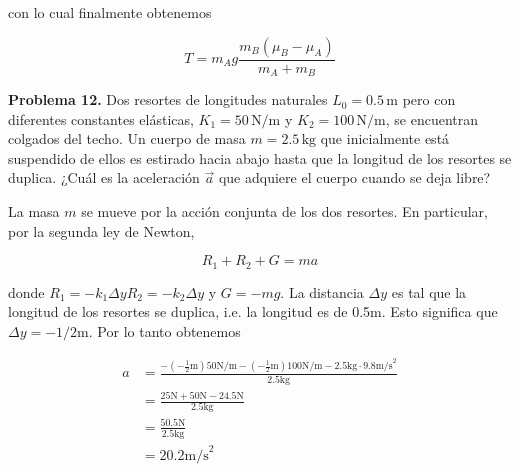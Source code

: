 \documentclass[12pt]{article}
\theoremstyle{definition}
\begin{document}
con lo cual finalmente obtenemos 

\begin{equation*}
    T = m_A g \frac{m_B(\mu_B - \mu_A)}{m_A + m_B}
\end{equation*}

\pagebreak

\begin{shaded}
\textbf{Problema 12.}  
Dos resortes de longitudes naturales $L_0 = 0.5 \, \text{m}$ pero con diferentes constantes 
elásticas, $K_1 = 50 \, \text{N/m}$ y $K_2 = 100 \, \text{N/m}$, se encuentran colgados del 
techo. Un cuerpo de masa $m = 2.5 \, \text{kg}$ que inicialmente está suspendido de ellos es 
estirado hacia abajo hasta que la longitud de los resortes se duplica. ¿Cuál es la aceleración 
$\vec{a}$ que adquiere el cuerpo cuando se deja libre? \\[1em]

\begin{center}
\end{center}
\end{shaded}

La masa $m$ se mueve por la acción conjunta de los dos resortes. En particular,
por la segunda ley de Newton, 

\begin{equation*}
    R_1 + R_2 + G = ma
\end{equation*}

donde $R_1 = -k_1 \Delta y R_2 = -k_2 \Delta y$ y $G = -mg$. La distancia
$\Delta y$ es tal que la longitud de los resortes se duplica, i.e. la longitud
es de 0.5m. Esto significa que $\Delta y = -1 / 2 \text{m}$. Por lo tanto obtenemos 


\begin{align*}
    a 
    &= \frac{ -\left(-\frac{1}{2}\text{m}\right)50\text{N/m} - \left(
        -\frac{1}{2}\text{m}\right)100\text{N/m} - 2.5\text{kg} \cdot 9.8\text{m/s}^2
    }{2.5\text{kg}}\\ 
    &= \frac{25\text{N} + 50\text{N} - 24.5\text{N}}{2.5\text{kg}}\\ 
    &= \frac{50.5 \text{N}}{2.5\text{kg}} \\ 
    &=20.2\text{m/s}^2
\end{align*}
\end{document}
